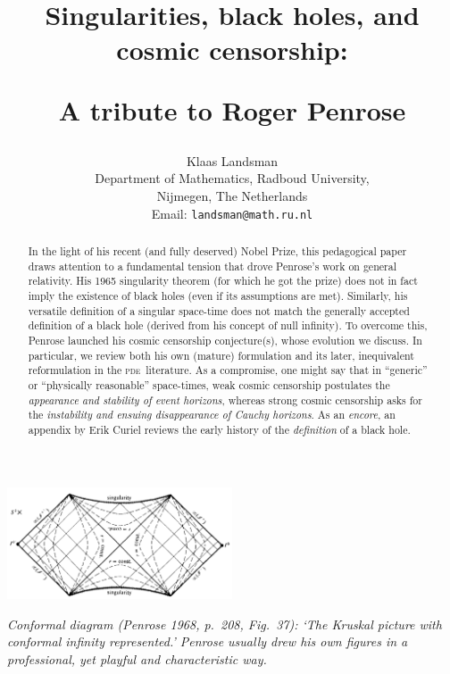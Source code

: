 \documentclass[12pt]{article}
\newcommand{\pde}{\textsc{pde}}
\begin{document}
\title{Singularities, black holes, and cosmic censorship: \smallskip

A tribute to Roger Penrose}
\author{Klaas Landsman\\
  Department of Mathematics, Radboud University, \\
  Nijmegen, The Netherlands\\
Email:
\texttt{landsman@math.ru.nl}
}
\date{}
\maketitle

\begin{abstract} 
\noindent 
In the light of his recent (and fully deserved) Nobel Prize, this pedagogical paper draws attention to a fundamental tension that drove Penrose's work on general relativity. His 1965 singularity theorem (for which he got the prize) does not in fact imply the existence of black holes (even if its assumptions are met). Similarly, his versatile definition of a singular space-time does not match the generally accepted definition of a black hole (derived from his concept of null infinity). To overcome this, Penrose launched his cosmic censorship conjecture(s), whose evolution we discuss. In particular, we review both his own (mature) formulation and its later, inequivalent reformulation in the \pde\ literature. As a compromise, one might say that  in ``generic'' or ``physically reasonable'' space-times, weak cosmic censorship postulates the \emph{appearance and stability of event horizons}, whereas  strong cosmic censorship asks for the \emph{instability and ensuing disappearance of Cauchy horizons}.
As an \emph{encore}, an appendix by Erik Curiel  reviews the early history of the \emph{definition} of a black hole.
\end{abstract}


\newpage
\tableofcontents
\newpage

 \begin{center}
\includegraphics[width=0.5\textwidth]{PD1968.png} 
\end{center}
\emph{Conformal diagram (Penrose 1968, p.\ 208, Fig.\ 37): `The Kruskal picture with conformal infinity represented.'
Penrose usually drew his own figures in a  professional, yet playful and characteristic way. }
\end{document}
